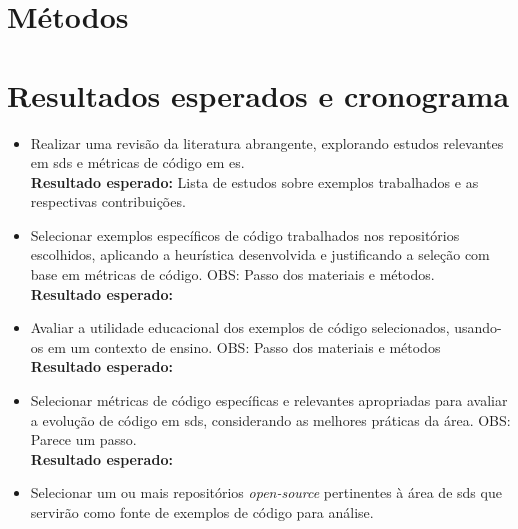 \section{Métodos}\label{sec:metodo}

\section{Resultados esperados e cronograma}

\begin{itemize}
    \item Realizar uma revisão da literatura abrangente, explorando estudos relevantes em \gls{sds} e métricas de código em \gls{es}.
    \\\textbf{Resultado esperado:} Lista de estudos sobre exemplos trabalhados e as respectivas contribuições.
    
    \item Selecionar exemplos específicos de código trabalhados nos repositórios escolhidos, aplicando a heurística desenvolvida e justificando a seleção com base em métricas de código. OBS: Passo dos materiais e métodos.
    \\\textbf{Resultado esperado:}
    
    \item Avaliar a utilidade educacional dos exemplos de código selecionados, usando-os em um contexto de ensino. OBS: Passo dos materiais e métodos
    \\\textbf{Resultado esperado:}
    
    \item Selecionar métricas de código específicas e relevantes apropriadas para avaliar a evolução de código em \gls{sds}, considerando as melhores práticas da área. OBS: Parece um passo.
    \\\textbf{Resultado esperado:}
    
    \item Selecionar um ou mais repositórios \textit{open-source} pertinentes à área de \gls{sds} que servirão como fonte de exemplos de código para análise.
\end{itemize}